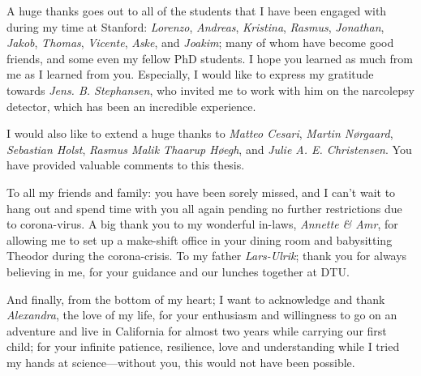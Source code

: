 A huge thanks goes out to all of the students that I have been engaged with during my time at Stanford: \emph{Lorenzo}, \emph{Andreas}, \emph{Kristina}, \emph{Rasmus}, \emph{Jonathan}, \emph{Jakob}, \emph{Thomas}, \emph{Vicente}, \emph{Aske}, and \emph{Joakim}; many of whom have become good friends, and some even my fellow PhD students.
I hope you learned as much from me as I learned from you.
Especially, I would like to express my gratitude towards \emph{Jens. B. Stephansen}, who invited me to work with him on the narcolepsy detector, which has been an incredible experience.

I would also like to extend a huge thanks to \emph{Matteo Cesari}, \emph{Martin Nørgaard}, \emph{Sebastian Holst}, \emph{Rasmus Malik Thaarup Høegh}, and \emph{Julie A. E. Christensen}. 
You have provided valuable comments to this thesis.

To all my friends and family: you have been sorely missed, and I can't wait to hang out and spend time with you all again pending no further restrictions due to corona-virus.
A big thank you to my wonderful in-laws, \emph{Annette \& Amr}, for allowing me to set up a make-shift office in your dining room and babysitting Theodor during the corona-crisis.
To my father \emph{Lars-Ulrik}; thank you for always believing in me, for your guidance and our lunches together at DTU. 

And finally, from the bottom of my heart; I want to acknowledge and thank \emph{Alexandra}, the love of my life, for your enthusiasm and willingness to go on an adventure and live in California for almost two years while carrying our first child; for your infinite patience, resilience, love and understanding while I tried my hands at science---without you, this would not have been possible.



